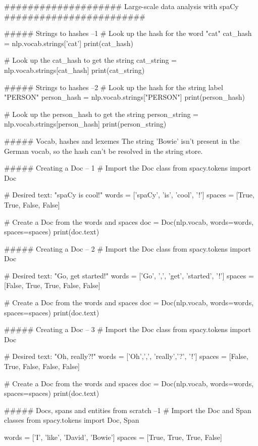 ####################   Large-scale data analysis with spaCy   ########################


##### Strings to hashes  --1
# Look up the hash for the word "cat"
cat_hash = nlp.vocab.strings['cat']
print(cat_hash)

# Look up the cat_hash to get the string
cat_string = nlp.vocab.strings[cat_hash]
print(cat_string)



##### Strings to hashes --2
# Look up the hash for the string label "PERSON"
person_hash = nlp.vocab.strings["PERSON"]
print(person_hash)

# Look up the person_hash to get the string
person_string = nlp.vocab.strings[person_hash]
print(person_string)


##### Vocab, hashes and lexemes
The string 'Bowie' isn't present in the German vocab, so the hash can't be resolved in the string store.


##### Creating a Doc    -- 1
# Import the Doc class
from spacy.tokens import Doc

# Desired text: "spaCy is cool!"
words = ['spaCy', 'is', 'cool', '!']
spaces = [True, True, False, False]

# Create a Doc from the words and spaces
doc = Doc(nlp.vocab, words=words, spaces=spaces)
print(doc.text)



##### Creating a Doc    -- 2
# Import the Doc class
from spacy.tokens import Doc

# Desired text: "Go, get started!"
words = ['Go', ',', 'get', 'started', '!']
spaces = [False, True, True, False, False]

# Create a Doc from the words and spaces
doc = Doc(nlp.vocab, words=words, spaces=spaces)
print(doc.text)



##### Creating a Doc    -- 3
# Import the Doc class
from spacy.tokens import Doc

# Desired text: "Oh, really?!"
words = ['Oh',',', 'really','?', '!']
spaces = [False, True, False, False, False]

# Create a Doc from the words and spaces
doc = Doc(nlp.vocab, words=words, spaces=spaces)
print(doc.text)



##### Docs, spans and entities from scratch   --1
# Import the Doc and Span classes
from spacy.tokens import Doc, Span

words = ['I', 'like', 'David', 'Bowie']
spaces = [True, True, True, False]

